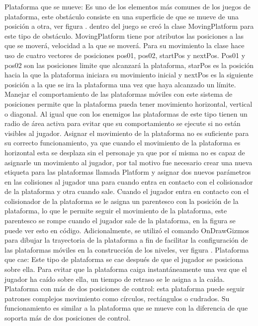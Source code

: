 Plataforma que se mueve: Es uno de los elementos más comunes de los juegos de plataforma, este   obstáculo consiste en una superficie de que se mueve de una posición a otra, ver figura . dentro del juego se creó la clase MovingPlatform para este tipo de obstáculo. MovingPlatform tiene por atributos las posiciones a las que se moverá, velocidad a la que se moverá. Para su movimiento la clase hace uso de cuatro vectores de posiciones pos01, pos02, startPos y nextPos. Pos01 y pos02 son las posiciones limite que alcanzará la plataforma, starPos es la posición hacia la que la plataforma iniciara su movimiento inicial y nextPos es la siguiente posición a la que se ira la plataforma una vez que haya alcanzado un límite. Manejar el comportamiento de las plataformas móviles con este sistema de posiciones permite que la plataforma pueda tener movimiento horizontal, vertical o diagonal. Al igual que con los enemigos las plataformas de este tipo tienen un radio de área activa para evitar que su comportamiento se ejecute si no están visibles al jugador. Asignar el movimiento de la plataforma no es suficiente para su correcto funcionamiento, ya que cuando el movimiento de la plataforma es horizontal esta se desplaza sin el personaje ya que por sí misma no es capaz de asignarle un movimiento al jugador, por tal motivo fue necesario crear una nueva etiqueta para las plataformas llamada Platform y asignar dos nuevos parámetros en las colisiones al jugador una para cuando entra en contacto con el colisionador de la plataforma y otra cuando sale. Cuando el jugador entra en contacto con el colisionador de la plataforma se le asigna un parentesco con la posición de la plataforma, lo que le permite seguir el movimiento de la plataforma, este parentesco se rompe cuando el jugador sale de la plataforma, en la figura se puede ver esto en código. Adicionalmente, se utilizó el comando OnDrawGizmos para dibujar la trayectoria de la plataforma a fin de facilitar la configuración de las plataformas móviles en la construcción de los niveles, ver figura .
Plataforma que cae: Este tipo de plataforma se cae después de que el jugador se posiciona sobre ella. Para evitar que la plataforma caiga instantáneamente una vez que el jugador ha caído sobre ella, un tiempo de retraso se le asigna a la caída.
Plataforma con más de dos posiciones de control: esta plataforma puede seguir patrones complejos movimiento como círculos, rectángulos o cudrados. Su funcionamiento es similar a la plataforma que se mueve con la diferencia de que soporta más de dos posiciones de control.
